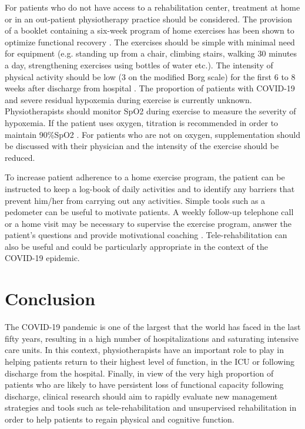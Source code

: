 For patients who do not have access to a rehabilitation center, treatment at home or in an out-patient physiotherapy practice should be considered. The provision of a booklet containing a six-week program of home exercises has been shown to optimize functional recovery \cite{jones_rehabilitation_2003}. The exercises should be simple with minimal need for equipment (e.g. standing up from a chair, climbing stairs, walking 30 minutes a day, strengthening exercises using bottles of water etc.). The intensity of physical activity should be low (3 on the modified Borg scale) for the first 6 to 8 weeks after discharge from hospital \cite{noauthor_covid-19_2020}. The proportion of patients with COVID-19 and severe residual hypoxemia during exercise is currently unknown. Physiotherapists should monitor SpO2 during exercise to measure the severity of hypoxemia. If the patient uses oxygen, titration is recommended in order to maintain 90\%SpO2 \cite{hillegass2014supplemental}. For patients who are not on oxygen, supplementation should be discussed with their physician and the intensity of the exercise should be reduced. 

To increase patient adherence to a home exercise program, the patient can be instructed to keep a log-book of daily activities and to identify any barriers that prevent him/her from carrying out any activities. Simple tools such as a pedometer can be useful to motivate patients. A weekly follow-up telephone call or a home visit  may be necessary to supervise the exercise program, answer the patient's questions and provide motivational coaching \cite{holland_home-based_2017}. Tele-rehabilitation can also be useful \cite{bonnevie2019people} and could be particularly appropriate in the context of the COVID-19 epidemic.

\section{Conclusion}
The COVID-19 pandemic is one of the largest that the world has faced in the last fifty years, resulting in a high number of hospitalizations and saturating intensive care units. In this context, physiotherapists have an important role to play in helping patients return to their highest level of function, in the ICU or following discharge from the hospital. 
Finally, in view of the very high proportion of patients who are likely to have persistent loss of functional capacity following discharge, clinical research should aim to rapidly evaluate new management strategies and tools such as tele-rehabilitation and unsupervised rehabilitation in order to help patients to regain physical and cognitive function.
